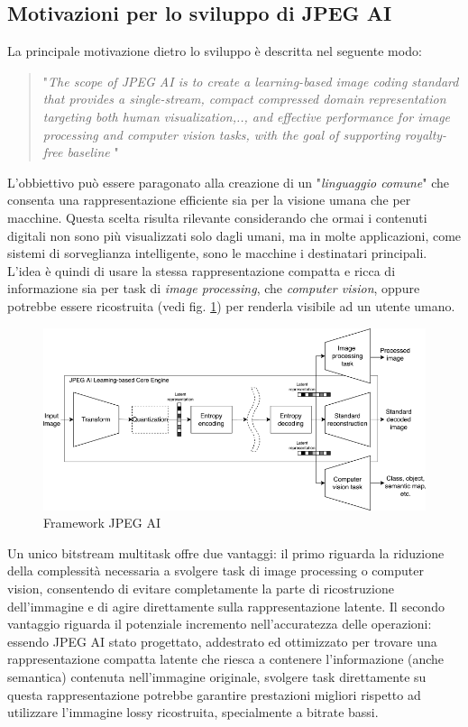 \subsection{Motivazioni per lo sviluppo di JPEG AI}
La principale motivazione dietro lo sviluppo è descritta nel seguente modo:
\begin{quote}
    "\textit{The scope of JPEG AI is to create a learning-based image coding standard that provides a single-stream, compact compressed domain representation targeting both human visualization,.., and effective performance for image processing and computer vision tasks, with the goal of supporting royalty-free baseline} \cite{ascenso2023jpegAI}"
\end{quote} L'obbiettivo può essere paragonato alla creazione di un "\textit{linguaggio comune}" che consenta una rappresentazione efficiente sia per la visione umana che per macchine. Questa scelta risulta rilevante considerando che ormai i contenuti digitali non sono più visualizzati solo dagli umani, ma in molte applicazioni, come sistemi di sorveglianza intelligente, sono le macchine i destinatari principali.
L'idea è quindi di usare la stessa rappresentazione compatta e ricca di informazione sia per task di \textit{image processing}, che \textit{computer vision}, oppure potrebbe essere ricostruita (vedi fig. \ref{fig:fig:jpeg_frw}) per renderla visibile ad un utente umano.\\
\begin{figure}
    \centering
    \includegraphics[width=1\linewidth]{img/JPEG AI.png}
    \caption{Framework JPEG AI}
    \label{fig:fig:jpeg_frw}
\end{figure}
Un unico bitstream multitask offre due vantaggi: il primo riguarda la riduzione della complessità necessaria a svolgere task di image processing o computer vision, consentendo di evitare completamente la parte di ricostruzione dell'immagine e di agire direttamente sulla rappresentazione latente. Il secondo vantaggio riguarda il potenziale incremento nell'accuratezza delle operazioni: essendo JPEG AI stato progettato, addestrato ed ottimizzato per trovare una rappresentazione compatta latente che riesca a contenere l'informazione (anche semantica) contenuta nell'immagine originale, svolgere task direttamente su questa rappresentazione potrebbe garantire prestazioni migliori rispetto ad utilizzare l'immagine lossy ricostruita, specialmente a bitrate bassi.\\
